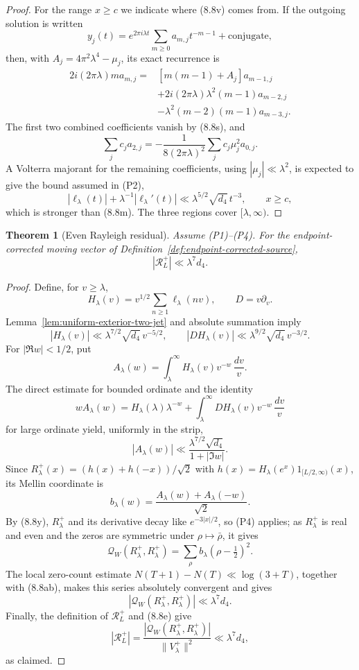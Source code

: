 \documentclass[11pt]{amsart}
\newtheorem{theorem}{Theorem}[section]
\theoremstyle{definition}
\theoremstyle{remark}
\newcommand{\QW}{\mathcal Q_W}
\begin{document}
\begin{proof}
For the range \(x\ge c\) we indicate where (8.8v) comes from.  If the outgoing solution is
written
\[
 y_j(t)=e^{2\pi i\lambda t}
 \sum_{m\ge0}a_{m,j}t^{-m-1}+\text{conjugate},
\]
then, with \(A_j=4\pi^2\lambda^4-\mu_j\), its exact recurrence is
\[
 \begin{aligned}
 2i(2\pi\lambda)m a_{m,j}
 ={}&[m(m-1)+A_j]a_{m-1,j}\\
 &+2i(2\pi\lambda)\lambda^2(m-1)a_{m-2,j}\\
 &-\lambda^2(m-2)(m-1)a_{m-3,j}.
 \end{aligned}
\tag{8.8t}
\]
The first two combined coefficients vanish by (8.8s), and
\[
 \sum_jc_ja_{2,j}
 =-\frac1{8(2\pi\lambda)^2}
   \sum_jc_j\mu_j^2a_{0,j}.
\tag{8.8u}
\]
A Volterra majorant for the remaining coefficients, using
\(|\mu_j|\ll\lambda^2\), is expected to give the bound assumed in (P2),
\[
 |\ell_\lambda(t)|+\lambda^{-1}|\ell_\lambda'(t)|
 \ll\lambda^{5/2}\sqrt{d_4}\,t^{-3},
 \qquad x\ge c,
\tag{8.8v}
\]
which is stronger than (8.8m).  The three regions cover
\([\lambda,\infty)\).
\end{proof}

\begin{theorem}[Even Rayleigh residual]
\label{thm:even-rayleigh-residual}
Assume (P1)--(P4).  For the endpoint-corrected moving vector of
Definition~\ref{def:endpoint-corrected-source},
\[
 \boxed{|\mathscr R_L^+|\ll\lambda^7d_4.}
\tag{8.8w}
\]
\end{theorem}

\begin{proof}
Define, for \(v\ge\lambda\),
\[
 H_\lambda(v)=v^{1/2}\sum_{n\ge1}\ell_\lambda(nv),
 \qquad D=v\partial_v.
\tag{8.8x}
\]
Lemma~\ref{lem:uniform-exterior-two-jet} and absolute summation imply
\[
 |H_\lambda(v)|\ll
 \lambda^{7/2}\sqrt{d_4}\,v^{-5/2},
 \qquad
 |DH_\lambda(v)|\ll
 \lambda^{9/2}\sqrt{d_4}\,v^{-3/2}.
\tag{8.8y}
\]
For \(|\Re w|<1/2\), put
\[
 A_\lambda(w)=\int_\lambda^\infty
 H_\lambda(v)v^{-w}\,\frac{dv}{v}.
\tag{8.8z}
\]
The direct estimate for bounded ordinate and the identity
\[
 wA_\lambda(w)
 =H_\lambda(\lambda)\lambda^{-w}
 +\int_\lambda^\infty
 DH_\lambda(v)v^{-w}\,\frac{dv}{v}
\tag{8.8aa}
\]
for large ordinate yield, uniformly in the strip,
\[
 |A_\lambda(w)|
 \ll\frac{\lambda^{7/2}\sqrt{d_4}}
          {1+|\Im w|}.
\tag{8.8ab}
\]
Since \(R_\lambda^+(x)=(h(x)+h(-x))/\sqrt2\) with
\(h(x)=H_\lambda(e^x)1_{[L/2,\infty)}(x)\), its Mellin coordinate is
\[
 b_\lambda(w)=
 \frac{A_\lambda(w)+A_\lambda(-w)}{\sqrt2}.
\tag{8.8ac}
\]
By (8.8y), \(R_\lambda^+\) and its derivative decay like
\(e^{-3|x|/2}\), so (P4) applies; as \(R_\lambda^+\) is real and even and
the zeros are symmetric under \(\rho\mapsto\bar\rho\), it gives
\[
 \QW(R_\lambda^+,R_\lambda^+)
 =\sum_\rho b_\lambda(\rho-\tfrac12)^2.
\tag{8.8ad}
\]
The local zero-count estimate \(N(T+1)-N(T)\ll\log(3+T)\), together
with (8.8ab), makes this series absolutely convergent and gives
\[
 |\QW(R_\lambda^+,R_\lambda^+)|
 \ll\lambda^7d_4.
\tag{8.8ae}
\]
Finally, the definition of \(\mathscr R_L^+\) and (8.8e) give
\[
 |\mathscr R_L^+|
 =\frac{|\QW(R_\lambda^+,R_\lambda^+)|}
        {\|V_\lambda^+\|^2}
 \ll\lambda^7d_4,
\]
as claimed.
\end{proof}
\end{document}
